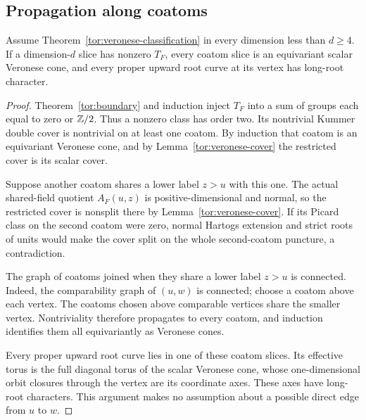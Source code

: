 \subsection{Propagation along coatoms}
\begin{lemma}\label{tor:coatom}
Assume Theorem~\ref{tor:veronese-classification} in every dimension less than $d\ge4$. If a dimension-$d$ slice has nonzero $T_F$, every coatom slice is an equivariant scalar Veronese cone, and every proper upward root curve at its vertex has long-root character.
\end{lemma}
\begin{proof}
Theorem~\ref{tor:boundary} and induction inject $T_F$ into a sum of groups each equal to zero or $\mathbb Z/2$. Thus a nonzero class has order two. Its nontrivial Kummer double cover is nontrivial on at least one coatom. By induction that coatom is an equivariant Veronese cone, and by Lemma~\ref{tor:veronese-cover} the restricted cover is its scalar cover.

Suppose another coatom shares a lower label $z>u$ with this one. The actual shared-field quotient $A_F(u,z)$ is positive-dimensional and normal, so the restricted cover is nonsplit there by Lemma~\ref{tor:veronese-cover}. If its Picard class on the second coatom were zero, normal Hartogs extension and strict roots of units would make the cover split on the whole second-coatom puncture, a contradiction.

The graph of coatoms joined when they share a lower label $z>u$ is connected. Indeed, the comparability graph of $(u,w)$ is connected; choose a coatom above each vertex. The coatoms chosen above comparable vertices share the smaller vertex. Nontriviality therefore propagates to every coatom, and induction identifies them all equivariantly as Veronese cones.

Every proper upward root curve lies in one of these coatom slices. Its effective torus is the full diagonal torus of the scalar Veronese cone, whose one-dimensional orbit closures through the vertex are its coordinate axes. These axes have long-root characters. This argument makes no assumption about a possible direct edge from $u$ to $w$.
\end{proof}

